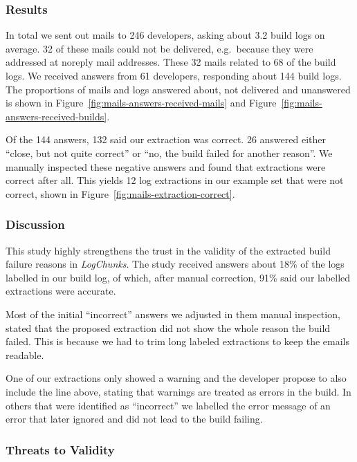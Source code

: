 \documentclass[\myrootdir/main.tex]{subfiles}
\begin{document}
\subsubsection{Results}
In total we sent out mails to 246 developers, asking about 3.2 build logs on average.
32 of these mails could not be delivered, e.g.\ because they were addressed at noreply mail addresses.
These 32 mails related to 68 of the build logs.
We received answers from 61 developers, responding about 144 build logs.
The proportions of mails and logs answered about, not delivered and unanswered is shown in Figure~\ref{fig:mails-answers-received-mails} and Figure~\ref{fig:mails-answers-received-builds}.

Of the 144 answers, 132 said our extraction was correct.
26 answered either ``close, but not quite correct'' or ``no, the build failed for another reason''.
We manually inspected these negative answers and found that extractions were correct after all.
This yields 12 log extractions in our example set that were not correct, shown in Figure~\ref{fig:mails-extraction-correct}.

\subsubsection{Discussion}
This study highly strengthens the trust in the validity of the extracted build failure reasons in \emph{LogChunks}.
The study received answers about 18\% of the logs labelled in our build log, of which, after manual correction, 91\% said our labelled extractions were accurate.

Most of the initial ``incorrect'' answers we adjusted in them manual inspection, stated that the proposed extraction did not show the whole reason the build failed.
This is because we had to trim long labeled extractions to keep the emails readable.

One of our extractions only showed a warning and the developer propose to also include the line above, stating that warnings are treated as errors in the build.
In others that were identified as ``incorrect'' we labelled the error message of an error that later ignored and did not lead to the build failing.

\subsubsection{Threats to Validity}
\end{document}
